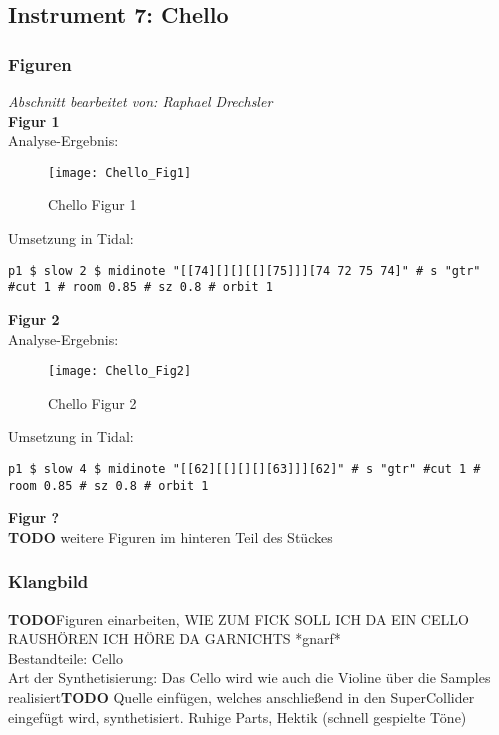 \documentclass[
10pt, %
a4paper, %
oneside, %
headinclude,footinclude, %
BCOR5mm, %
]{scrartcl}
\begin{document}
\subsection{Instrument 7: Chello}
\subsubsection{Figuren}
\textit{Abschnitt bearbeitet von: Raphael Drechsler}\\

\noindent\textbf{Figur 1}\\
Analyse-Ergebnis:
\begin{figure}[h]
	\centering 
	\texttt{[image: Chello\_Fig1]} 
	\caption{Chello Figur 1}
\end{figure}

\noindent Umsetzung in Tidal:
\begin{lstlisting}
p1 $ slow 2 $ midinote "[[74][][][[][75]]][74 72 75 74]" # s "gtr" #cut 1 # room 0.85 # sz 0.8 # orbit 1
\end{lstlisting}

\noindent\textbf{Figur 2}\\
Analyse-Ergebnis:
\begin{figure}[h]
	\centering 
	\texttt{[image: Chello\_Fig2]} 
	\caption{Chello Figur 2}
\end{figure}

\noindent Umsetzung in Tidal:
\begin{lstlisting}
p1 $ slow 4 $ midinote "[[62][[][][][63]]][62]" # s "gtr" #cut 1 # room 0.85 # sz 0.8 # orbit 1
\end{lstlisting}

\noindent\textbf{Figur ?}\\
{\color{red}\textbf{TODO}} weitere Figuren im hinteren Teil des Stückes

\subsubsection{Klangbild}
{\color{red}\textbf{TODO}}Figuren einarbeiten, WIE ZUM FICK SOLL ICH DA EIN CELLO RAUSHÖREN ICH HÖRE DA GARNICHTS *gnarf*\\
Bestandteile: Cello\\
Art der Synthetisierung: Das Cello wird wie auch die Violine über die Samples realisiert{\color{red}\textbf{TODO}} Quelle einfügen, welches anschließend in den SuperCollider eingefügt wird, synthetisiert.
Ruhige Parts, Hektik (schnell gespielte Töne)
\end{document}
